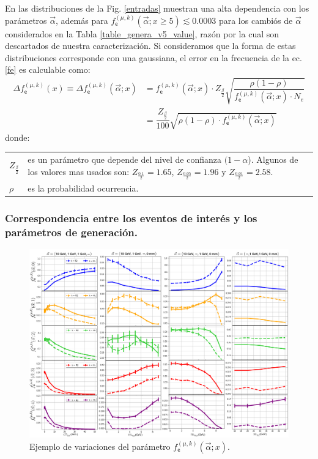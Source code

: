 En las distribuciones de la Fig. \ref{entradas} muestran una alta dependencia con los parámetros $\vec{\alpha}$, además para $f^{(\mu, k)}_\textsf{e} (\vec{\alpha}; x\geqslant 5)\lesssim 0.0003$ para los cambiós de $\vec{\alpha}$ considerados en la Tabla  \ref{table_genera_v5_value}, razón por la cual son descartados de nuestra caracterización. Si consideramos que la forma de estas distribuciones corresponde con una gaussiana, el error en la frecuencia de la ec. \ref{fe} es calculable como:
\begin{eqnarray}\label{error0}
\Delta f^{(\mu, k)}_\textsf{e} (x) \equiv \Delta f^{(\mu, k)}_\textsf{e} (\vec{\alpha}; x) 
& = f^{(\mu, k)}_\textsf{e} (\vec{\alpha}; x) \cdot Z_{\frac{\beta}{2}} \sqrt{\dfrac{\rho(1-\rho)}{f^{(\mu, k)}_\textsf{e} (\vec{\alpha}; x)\cdot N_e}} \\
& = \dfrac{Z_{\frac{\beta}{2}}}{100} \sqrt{\rho(1-\rho)\cdot f^{(\mu, k)}_\textsf{e} (\vec{\alpha}; x)} ~~~~~~~~~~~
\end{eqnarray}%
donde:\\
\begin{tabular}{lp{14cm}}
$Z_{\frac{\beta}{2}}$ & es un parámetro que depende del nivel de confianza $(1-\alpha$). Algunos de los valores mas usados son: $Z_{\frac{0.1}{2}}=1.65$, $Z_{\frac{0.05}{2}}=1.96$ y $Z_{\frac{0.01}{2}}=2.58$.\\
$\rho$ & es la probabilidad ocurrencia.
\end{tabular}

\subsubsection{Correspondencia entre los eventos de interés y los parámetros de generación.}
\begin{figure}[!t]
\centering
\includegraphics[width=.9\textwidth]{Simulacion/imagenes/Comparacion_Distribucion_Entries0.png}
\caption{Ejemplo de variaciones del parámetro $f^{(\mu, k)}_\textsf{e} (\vec{\alpha}; x)$.}
\label{entradasALL}
\end{figure}

